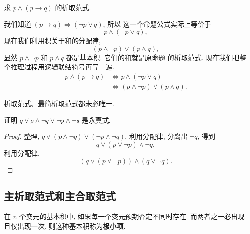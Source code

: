 \documentclass[10pt,UTF8]{book} %
\begin{document}
\begin{example}
    求 $p \wedge (p \longrightarrow q)$ 的析取范式.
    \begin{sol}
        我们知道 $(p \longrightarrow q) \iff (\lnot p \vee q)$, 所以
        这一个命题公式实际上等价于
        \[ p \wedge (\lnot p \vee q), \]
        现在我们利用积关于和的分配律,
        \[ (p\wedge \lnot p) \vee (p \wedge q), \]
        显然 $p \wedge \lnot p$ 和 $p \wedge q$ 都是基本积. 它们的和就是原命题
        的析取范式. 现在我们把整个推理过程用逻辑联结符号再写一遍:
        \[ \begin{aligned}
            p \wedge (p \longrightarrow q) & \iff 
            p \wedge (\lnot p \vee q) \\ 
            & \iff (p\wedge \lnot p) \vee (p \wedge q).
        \end{aligned} \]
    \end{sol}
\end{example}

\begin{remark}
    析取范式、最简析取范式都未必唯一.
\end{remark}

\begin{example}
    证明 $q \vee p \wedge \lnot q \vee \lnot p \wedge \lnot q$ 是永真式.
    \begin{proof}
        整理, $q \vee (p \wedge \lnot q) \vee (\lnot p \wedge \lnot q)$,
        利用分配律, 分离出 $\lnot q$, 得到
        \[ q \vee (p \vee \lnot p) \wedge \lnot q, \]
        利用分配律,
        \[ (q \vee (p \vee \lnot p)) \wedge (q \vee \lnot q). \]
    \end{proof}
\end{example}

\subsection{主析取范式和主合取范式}

\begin{definition}
    在 $n$ 个变元的基本积中, 如果每一个变元预期否定不同时存在, 而两者之一必出现
    且仅出现一次, 则这种基本积称为\textbf{极小项}.
\end{definition}
\end{document}
